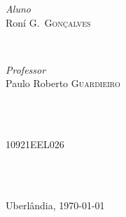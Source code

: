 \documentclass[11pt]{article}
\begin{document}
\begin{titlepage}
\begin{minipage}{0.4\textwidth}
\begin{flushleft} \large
\emph{Aluno}\\
Roní G.\ \textsc{Gonçalves}\\%
\end{flushleft}
\end{minipage}
~
\begin{minipage}{0.4\textwidth}
\begin{flushright} \large
\emph{Professor} \\
Paulo Roberto \textsc{Guardieiro}\\ %
\end{flushright}
\end{minipage}\\[0.1cm]
~
\begin{minipage}{0.85\textwidth}
\begin{flushleft} \large
10921EEL026 %
\end{flushleft}
\end{minipage}\\[3cm]
~


{\large Uberlândia, \today}\\[1cm] %


\vfill %

\end{titlepage}

\setcounter{page}{2}
\end{document}
